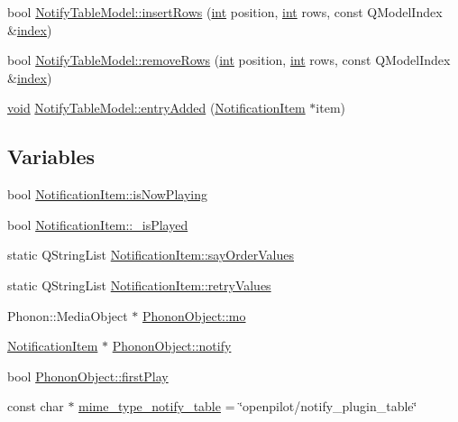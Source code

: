 \begin{DoxyCompactItemize}
\item 
bool \hyperlink{group__notifyplugin_ga989fe66cec593e3ae8a3715160d4db33}{Notify\-Table\-Model\-::insert\-Rows} (\hyperlink{ioapi_8h_a787fa3cf048117ba7123753c1e74fcd6}{int} position, \hyperlink{ioapi_8h_a787fa3cf048117ba7123753c1e74fcd6}{int} rows, const Q\-Model\-Index \&\hyperlink{glext_8h_ab47dd9958bcadea08866b42bf358e95e}{index})
\item 
bool \hyperlink{group__notifyplugin_ga3e038f81c56a42999341a5704f703dd3}{Notify\-Table\-Model\-::remove\-Rows} (\hyperlink{ioapi_8h_a787fa3cf048117ba7123753c1e74fcd6}{int} position, \hyperlink{ioapi_8h_a787fa3cf048117ba7123753c1e74fcd6}{int} rows, const Q\-Model\-Index \&\hyperlink{glext_8h_ab47dd9958bcadea08866b42bf358e95e}{index})
\item 
\hyperlink{group___u_a_v_objects_plugin_ga444cf2ff3f0ecbe028adce838d373f5c}{void} \hyperlink{group__notifyplugin_gaa28f89364ed3f06a9e1ab36b51216b65}{Notify\-Table\-Model\-::entry\-Added} (\hyperlink{class_notification_item}{Notification\-Item} $\ast$item)
\end{DoxyCompactItemize}
\subsection*{Variables}
\begin{DoxyCompactItemize}
\item 
bool \hyperlink{group__notifyplugin_gabd9ee81e318805b60e89e7045eb7deaa}{Notification\-Item\-::is\-Now\-Playing}
\item 
bool \hyperlink{group__notifyplugin_ga6469ec28d3051122de855c266d0dc6dd}{Notification\-Item\-::\-\_\-is\-Played}
\item 
static Q\-String\-List \hyperlink{group__notifyplugin_ga856cd4e9d78e6c8900f9de74f0f25dac}{Notification\-Item\-::say\-Order\-Values}
\item 
static Q\-String\-List \hyperlink{group__notifyplugin_ga7c47e100b3ea3f8b527dbdea2385edd0}{Notification\-Item\-::retry\-Values}
\item 
Phonon\-::\-Media\-Object $\ast$ \hyperlink{group__notifyplugin_ga3b35d975a7599cd263b275559734e54d}{Phonon\-Object\-::mo}
\item 
\hyperlink{class_notification_item}{Notification\-Item} $\ast$ \hyperlink{group__notifyplugin_ga82a15e7062562dabd14047b2e5398889}{Phonon\-Object\-::notify}
\item 
bool \hyperlink{group__notifyplugin_ga86b5c4ceede5297e656149cd1f1af3fe}{Phonon\-Object\-::first\-Play}
\item 
const char $\ast$ \hyperlink{group__notifyplugin_ga326ccffe8d16a6f14d44c2048dea58a7}{mime\-\_\-type\-\_\-notify\-\_\-table} = \char`\"{}openpilot/notify\-\_\-plugin\-\_\-table\char`\"{}
\end{DoxyCompactItemize}
